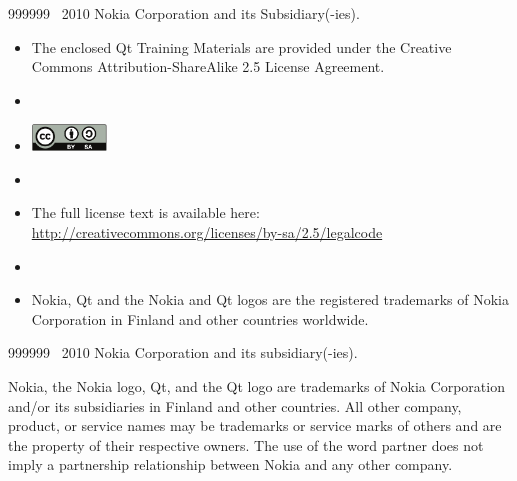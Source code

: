 {
  
  \begin{slide}{999999}
    \vspace{5em}
    \textcopyright~2010 Nokia Corporation and its Subsidiary(-ies).    
    \vspace{2em}                                                     
    \begin{itemize}
      \item[] \footnotesize{The enclosed Qt Training Materials are provided under the
        Creative Commons Attribution-ShareAlike 2.5 License Agreement.}
      \item[]
      \item[] \mbox{\includegraphics[width=20mm]{images/cc-by-sa}}
      \item[]
      \item[] \footnotesize{The full license text is available here:  
      \url{http://creativecommons.org/licenses/by-sa/2.5/legalcode}}
      \item[]    
      \item[] \footnotesize{Nokia, Qt and the Nokia and Qt logos are the registered trademarks 
      of Nokia Corporation in Finland and other countries worldwide.}
    \end{itemize}
    
  \end{slide}
  
} %
{ %
  
  \begin{slide}{999999}
    \vspace{5em}
    \textcopyright~2010 Nokia Corporation and its subsidiary(-ies).
    
    \vspace{2em}
    {\small Nokia, the Nokia logo, Qt, and the Qt logo are trademarks of Nokia
      Corporation and/or its subsidiaries in Finland and other countries.
      All other company, product, or service names may be trademarks or service marks
      of others and are the property of their respective owners. The use of the word
      partner does not imply a partnership relationship between Nokia and any other
      company.}
    
  \end{slide}
}
